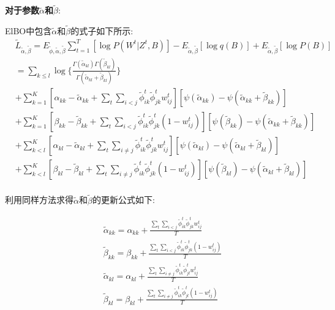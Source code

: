 \textbf{对于参数$\widetilde{\alpha}$和$\widetilde{\beta}$}:

ElBO中包含$\widetilde{\alpha}$和$\widetilde{\beta}$的式子如下所示:
\begin{equation}
\begin{split}
&\widetilde{L}_{\widetilde{\alpha},\widetilde{\beta}} = E_{\widetilde{\phi},\widetilde{\alpha},\widetilde{\beta}} \sum_{t=1}^T [\log P(W^t|Z^t,B)] 
- E_{\widetilde{\alpha},\widetilde{\beta}}[\log q(B)] + E_{\widetilde{\alpha},\widetilde{\beta}}[\log P(B)]\\
&= \sum_{k \leq l} \log\{\frac{\Gamma(\widetilde{\alpha}_{kl})\Gamma(\widetilde{\beta}_{kl})}{\Gamma(\widetilde{\alpha}_{kl}+\widetilde{\beta}_{kl})}   \}  \\
&+ \sum_{k=1}^K [\alpha_{kk}- \widetilde{\alpha}_{kk} +\sum_t \sum_{i < j} \widetilde{\phi}_{ik}^t\widetilde{\phi}_{jk}^t w_{ij}^t]
[\psi(\widetilde{\alpha}_{kk})-\psi (\widetilde{\alpha}_{kk}+\widetilde{\beta}_{kk})] \\
&+ \sum_{k=1}^K [\beta_{kk}- \widetilde{\beta}_{kk} +\sum_t \sum_{i < j} \widetilde{\phi}_{ik}^t\widetilde{\phi}_{jk}^t(1- w_{ij}^t)]
[\psi(\widetilde{\beta}_{kk})-\psi (\widetilde{\alpha}_{kk}+\widetilde{\beta}_{kk})] \\
&+ \sum_{k<l}^K [\alpha_{kl}- \widetilde{\alpha}_{kl} +\sum_t \sum_{i \neq j} \widetilde{\phi}_{ik}^t\widetilde{\phi}_{jk}^t w_{ij}^t]
[\psi(\widetilde{\alpha}_{kl})-\psi (\widetilde{\alpha}_{kl}+\widetilde{\beta}_{kl})] \\
&+ \sum_{k<l}^K [\beta_{kl}- \widetilde{\beta}_{kl} +\sum_t \sum_{i \neq j} \widetilde{\phi}_{ik}^t\widetilde{\phi}_{jk}^t(1- w_{ij}^t)]
[\psi(\widetilde{\beta}_{kl})-\psi (\widetilde{\alpha}_{kl}+\widetilde{\beta}_{kl})] \\
\end{split}
\end{equation}

利用同样方法求得$\widetilde{\alpha}$和$\widetilde{\beta}$的更新公式如下:

\begin{equation}
\label{eq6}
\begin{split}
& \widetilde{\alpha}_{kk} = \alpha_{kk} + \frac{\sum_t \sum_{i<j} \widetilde{\phi}_{ik}^t \widetilde{\phi}_{jk}^t w_{ij}^t}{T}  \\
& \widetilde{\beta}_{kk} = \beta_{kk} + \frac{\sum_t \sum_{i<j} \widetilde{\phi}_{ik}^t \widetilde{\phi}_{jk}^t (1-w_{ij}^t)}{T} \\
& \widetilde{\alpha}_{kl} = \alpha_{kl} + \frac{\sum_t \sum_{i \neq j} \widetilde{\phi}_{ik}^t \widetilde{\phi}_{jl}^t w_{ij}^t}{T} \\
& \widetilde{\beta}_{kl} = \beta_{kl} + \frac{\sum_t \sum_{i \neq j} \widetilde{\phi}_{ik}^t \widetilde{\phi}_{jl}^t (1-w_{ij}^t)}{T}  \\
\end{split}
\end{equation}

